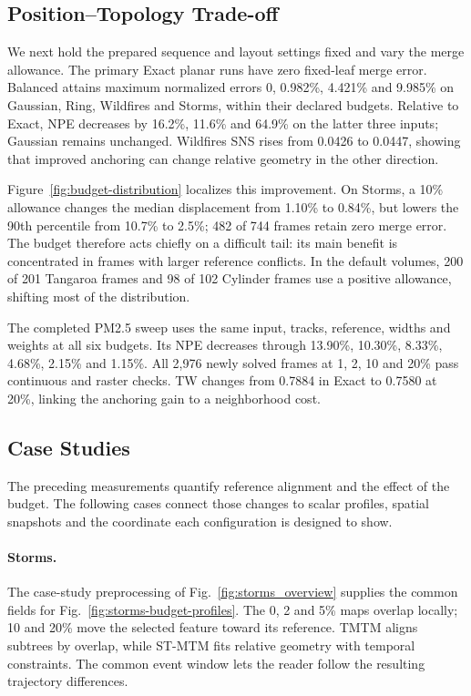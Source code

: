 \subsection{Position--Topology Trade-off}\label{sec:relaxation-results}
We next hold the prepared sequence and layout settings fixed and vary the merge allowance. The primary Exact planar runs have zero fixed-leaf merge error. Balanced attains maximum normalized errors 0, 0.982\%, 4.421\% and 9.985\% on Gaussian, Ring, Wildfires and Storms, within their declared budgets. Relative to Exact, NPE decreases by 16.2\%, 11.6\% and 64.9\% on the latter three inputs; Gaussian remains unchanged. Wildfires SNS rises from 0.0426 to 0.0447, showing that improved anchoring can change relative geometry in the other direction.

Figure~\ref{fig:budget-distribution} localizes this improvement. On Storms, a 10\% allowance changes the median displacement from 1.10\% to 0.84\%, but lowers the 90th percentile from 10.7\% to 2.5\%; 482 of 744 frames retain zero merge error. The budget therefore acts chiefly on a difficult tail: its main benefit is concentrated in frames with larger reference conflicts. In the default volumes, 200 of 201 Tangaroa frames and 98 of 102 Cylinder frames use a positive allowance, shifting most of the distribution.

The completed PM2.5 sweep uses the same input, tracks, reference, widths and weights at all six budgets. Its NPE decreases through 13.90\%, 10.30\%, 8.33\%, 4.68\%, 2.15\% and 1.15\%. All 2,976 newly solved frames at 1, 2, 10 and 20\% pass continuous and raster checks. TW changes from 0.7884 in Exact to 0.7580 at 20\%, linking the anchoring gain to a neighborhood cost.

\subsection{Case Studies}

The preceding measurements quantify reference alignment and the effect of the budget. The following cases connect those changes to scalar profiles, spatial snapshots and the coordinate each configuration is designed to show.

\paragraph{Storms.} The case-study preprocessing of Fig.~\ref{fig:storms_overview} supplies the common fields for Fig.~\ref{fig:storms-budget-profiles}. The 0, 2 and 5\% maps overlap locally; 10 and 20\% move the selected feature toward its reference. TMTM aligns subtrees by overlap, while ST-MTM fits relative geometry with temporal constraints. The common event window lets the reader follow the resulting trajectory differences.


